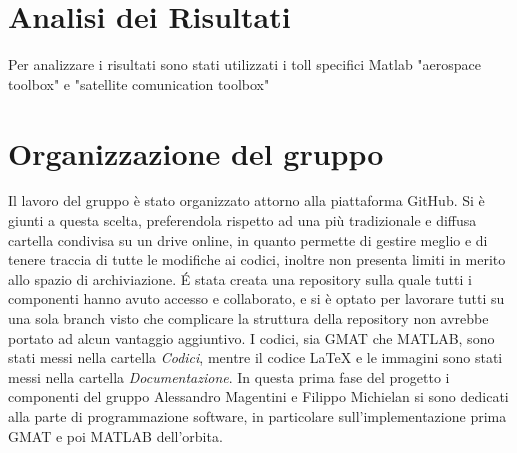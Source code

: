 \documentclass[12pt, a4paper]{article}
\begin{document}
\section{Analisi dei Risultati}
Per analizzare i risultati sono stati utilizzati i toll specifici Matlab "aerospace toolbox" e "satellite comunication toolbox"
\section{Organizzazione del gruppo}
Il lavoro del gruppo è stato organizzato attorno alla piattaforma GitHub. Si è giunti a questa scelta, preferendola rispetto ad una più tradizionale e diffusa cartella condivisa su un drive online, in quanto permette di gestire meglio e di tenere traccia di tutte le modifiche ai codici, inoltre non presenta limiti in merito allo spazio di archiviazione. \'E stata creata una repository sulla quale tutti i componenti hanno avuto accesso e collaborato, e si è optato per lavorare tutti su una sola branch visto che complicare la struttura della repository non avrebbe portato ad alcun vantaggio aggiuntivo. 
I codici, sia GMAT che MATLAB, sono stati messi nella cartella \textsl{Codici}, mentre il codice LaTeX e le immagini sono stati messi nella cartella \textsl{Documentazione}.
In questa prima fase del progetto i componenti del gruppo Alessandro Magentini e Filippo Michielan si sono dedicati alla parte di programmazione software, in particolare sull'implementazione prima GMAT e poi MATLAB dell'orbita. 
\end{document}
